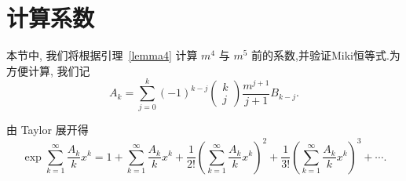 \documentclass{CombPaper}
\begin{document}
\section{计算系数}\label{sec4}
本节中, 我们将根据引理~\ref{lemma4} 计算 $m^{4}$ 与 $m^{5}$ 前的系数,并验证Miki恒等式.为方便计算, 我们记
\begin{equation}
A_{k}=\sum_{j=0}^{k}(-1)^{k-j}\left(\begin{array}{c}k \\ j\end{array}\right) \frac{m^{j+1}}{j+1} B_{k-j}.    
\end{equation}\par
由 Taylor 展开得
\begin{equation}\label{5}
\exp \sum_{k=1}^{\infty} \frac{A_{k}}{k} x^{k}=1+\sum_{k=1}^{\infty} \frac{A_{k}}{k} x^{k}+\frac{1}{2 !}\left(\sum_{k=1}^{\infty} \frac{A_{k}}{k} x^{k}\right)^{2}+\frac{1}{3 !}\left(\sum_{k=1}^{\infty} \frac{A_{k}}{k} x^{k}\right)^{3}+\cdots.
\end{equation}
\end{document}
